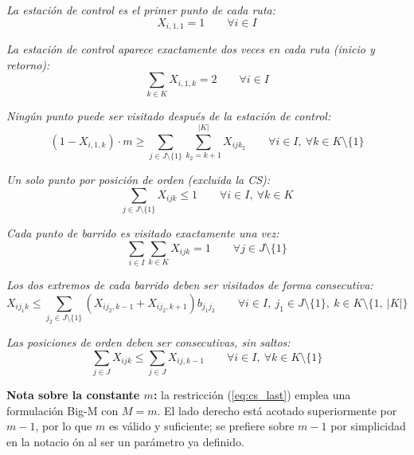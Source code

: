 \documentclass[11pt,a4paper]{article}
\begin{document}
\noindent\textit{La estación de control es el primer punto de cada ruta:}
\begin{equation}
    X_{i,1,1} = 1 \qquad \forall i \in I \label{eq:cs_first}
\end{equation}

\noindent\textit{La estación de control aparece exactamente dos veces en cada ruta (inicio y retorno):}
\begin{equation}
    \sum_{k \in K} X_{i,1,k} = 2 \qquad \forall i \in I \label{eq:cs_twice}
\end{equation}

\noindent\textit{Ningún punto puede ser visitado después de la estación de control:}
\begin{equation}
    (1 - X_{i,1,k}) \cdot m \geq \sum_{j \in J \setminus \{1\}} \sum_{k_2 = k+1}^{|K|} X_{ij k_2}
    \qquad \forall i \in I,\ \forall k \in K \setminus \{1\} \label{eq:cs_last}
\end{equation}

\noindent\textit{Un solo punto por posición de orden (excluida la CS):}
\begin{equation}
    \sum_{j \in J \setminus \{1\}} X_{ijk} \leq 1 \qquad \forall i \in I,\ \forall k \in K
\end{equation}

\noindent\textit{Cada punto de barrido es visitado exactamente una vez:}
\begin{equation}
    \sum_{i \in I} \sum_{k \in K} X_{ijk} = 1 \qquad \forall j \in J \setminus \{1\}
\end{equation}

\noindent\textit{Los dos extremos de cada barrido deben ser visitados de forma consecutiva:}
\begin{equation}
    X_{ij_1 k} \leq \sum_{j_2 \in J \setminus \{1\}} \left( X_{ij_2,k-1} + X_{ij_2,k+1} \right) b_{j_1 j_2}
    \qquad \forall i \in I,\ j_1 \in J \setminus \{1\},\ k \in K \setminus \{1,\ |K|\}
\end{equation}

\noindent\textit{Las posiciones de orden deben ser consecutivas, sin saltos:}
\begin{equation}
    \sum_{j \in J} X_{ijk} \leq \sum_{j \in J} X_{ij,k-1} \qquad \forall i \in I,\ \forall k \in K \setminus \{1\}
\end{equation}

\bigskip
\noindent\textbf{Nota sobre la constante $m$:} la restricción (\ref{eq:cs_last}) emplea una formulación Big-M con $M = m$. El lado derecho está acotado superiormente por $m-1$, por lo que $m$ es válido y suficiente; se prefiere sobre $m-1$ por simplicidad en la notacio
ón al ser un parámetro ya definido.
\end{document}

